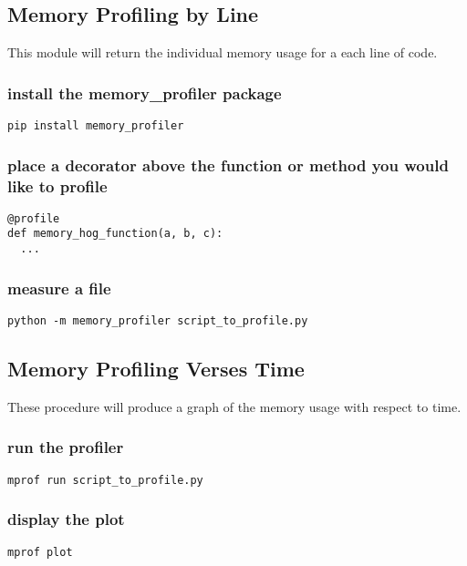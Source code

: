 \subsection{Memory Profiling by Line}
This module will return the individual memory usage for a each line of code.
{\color{red}{NOTE: this utility may only be run against a file saved to disk.}}

\subsubsection{install the memory\_profiler package}
\begin{lstlisting}
pip install memory_profiler
\end{lstlisting}

\subsubsection{place a decorator above the function or method you would like to profile}
\begin{lstlisting}
@profile
def memory_hog_function(a, b, c):
  ...
\end{lstlisting}

\subsubsection{measure a file}
\begin{lstlisting}
python -m memory_profiler script_to_profile.py
\end{lstlisting}

\subsection{Memory Profiling Verses Time}
These procedure will produce a graph of the memory usage with respect to time.

\subsubsection{run the profiler}
\begin{lstlisting}
mprof run script_to_profile.py
\end{lstlisting}

\subsubsection{display the plot}
\begin{lstlisting}
mprof plot
\end{lstlisting}

